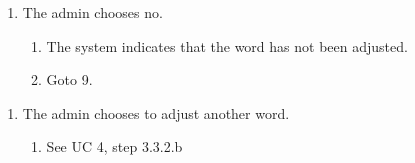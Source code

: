 \documentclass[12pt, letterpaper]{article}
\begin{document}
\begin{enumerate}[label=6.1.]
	\item The admin chooses no. 
	\begin{enumerate}[label=6.1.\arabic*]
		\item The system indicates that the word has not been adjusted.
		\item Goto 9.
	\end{enumerate}
\end{enumerate}
\begin{enumerate}[label=10.1.]
	\item The admin chooses to adjust another word. 
	\begin{enumerate}[label=10.1.\arabic*]
		\item See UC 4, step 3.3.2.b
	\end{enumerate}
\end{enumerate}
\end{document}
